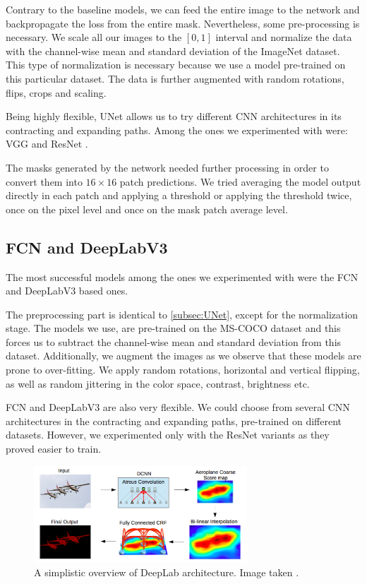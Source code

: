 Contrary to the baseline models, we can feed the entire image to the network and backpropagate the loss from the entire mask. Nevertheless, some pre-processing is necessary. We scale all our images to the $[0,1]$ interval and normalize the data with the channel-wise mean and standard deviation of the ImageNet \cite{Imagenet} dataset. This type of normalization is necessary because we use a model pre-trained on this particular dataset. The data is further augmented with random rotations, flips, crops and scaling.

Being highly flexible, UNet allows us to try different CNN architectures in its contracting and expanding paths. Among the ones we experimented with were: VGG \cite{Zis14} and ResNet \cite{He15}.

The masks generated by the network needed further processing in order to convert them into $16 \times 16$ patch predictions. We tried averaging the model output directly in each patch and applying a threshold or applying the threshold twice, once on the pixel level and once on the mask patch average level.

\subsection{FCN and DeepLabV3} \label{subsec:fcn-deeplab}
The most successful models among the ones we experimented with were the FCN \cite{Lon14} and DeepLabV3 \cite{Che17} based ones. 

The preprocessing part is identical to \autoref{subsec:UNet}, except for the normalization stage. The models we use, are pre-trained on the MS-COCO \cite{Coco} dataset and this forces us to subtract the channel-wise mean and standard deviation from this dataset. Additionally, we augment the images as we observe that these models are prone to over-fitting. We apply random rotations, horizontal and vertical flipping, as well as random jittering in the color space, contrast, brightness etc.

FCN and DeepLabV3 are also very flexible. We could choose from several CNN architectures in the contracting and expanding paths, pre-trained on different datasets. However, we experimented only with the ResNet variants as they proved easier to train.

\begin{figure}[h]
\includegraphics[width=8cm]{images/deeplabv2.png}
\caption{A simplistic overview of DeepLab architecture. Image taken \cite{Che17}.}
\end{figure}

